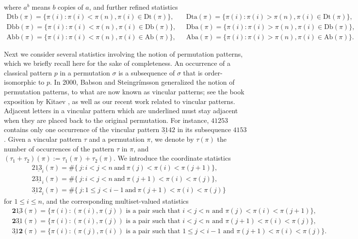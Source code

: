 \documentclass[12pt]{amsart}
\numberwithin{equation}{section}
\theoremstyle{plain}
\theoremstyle{definition}
\def\des{\mathrm{des}}
\def\Db{\mathrm{Db}}
\def\Ab{\mathrm{Ab}}
\def\Dt{\mathrm{Dt}}
\def\Dtb{\mathrm{Dtb}}
\def\Dta{\mathrm{Dta}}
\def\Dbb{\mathrm{Dbb}}
\def\Dba{\mathrm{Dba}}
\def\Abb{\mathrm{Abb}}
\def\Aba{\mathrm{Aba}}
\def\pprs{\mathrm{2\underline{13}}}
\def\ppwrs{\mathrm{2\underline{31}}}
\def\pp31-2{\mathrm{\underline{31}2}}
\def\rightascent{{\mathbf{2}\underline{13}}}
\def\leftdescent{\mathrm{\underline{31}}\mathbf{2}}
\def\rightdescent{\mathrm{\mathbf{2}\underline{31}}}
\def\inv{\mathrm{inv}}
\def\inv{\mathrm{inv}}
\begin{document}
where $a^b$ means $b$ copies of $a$, and further refined statistics
\begin{align*}
  \Dtb(\pi)=\{\pi(i) : \pi(i) <\pi(n), \pi(i) \in \Dt(\pi)\}, &\,\,\,\, \Dta(\pi)=\{\pi(i) : \pi(i) >\pi(n), \pi(i) \in \Dt(\pi)\}, \\[3pt]
  \Dbb(\pi)=\{\pi(i) : \pi(i) <\pi(n), \pi(i) \in \Db(\pi)\}, &\,\,\,\, \Dba(\pi)=\{\pi(i) : \pi(i) >\pi(n), \pi(i) \in \Db(\pi)\}, \\[3pt]
  \Abb(\pi)=\{\pi(i) : \pi(i) <\pi(n), \pi(i) \in \Ab(\pi)\}, & \,\,\,\,\Aba(\pi)=\{\pi(i) : \pi(i) >\pi(n), \pi(i) \in \Ab(\pi)\}.
\end{align*}


Next we consider several statistics involving the notion of permutation patterns, which we briefly recall here for the sake of completeness. An occurrence of a classical pattern $p$ in a permutation $\sigma$ is a subsequence of $\sigma$ that is order-isomorphic to $p$. In 2000, Babson and Steingr\'{i}msson \cite{BS} generalized the notion of permutation patterns, to what are now known as vincular patterns; see the book exposition by Kitaev \cite{Kit}, as well as our recent work \cite{ChenFu} related to vincular patterns. Adjacent letters in a vincular pattern which are underlined must stay adjacent when they are placed back to the original permutation. For instance, $41253$ contains only one occurrence of the vincular pattern $\underline{31}42$ in its subsequence $4153$. Given a vincular pattern $\tau$ and a permutation $\pi$, we denote by $\tau(\pi)$ the number of occurrences of the pattern $\tau$ in $\pi$, and $(\tau_1+\tau_2)(\pi):=\tau_1(\pi)+\tau_2(\pi)$. We introduce the coordinate statistics
\begin{eqnarray*}
& \pprs_i (\pi) =  \# \{ ~j : i <j <n  ~\text{and}~  \pi(j) < \pi(i) < \pi(j+1)  \},  \\[3pt]
&\ppwrs_i (\pi) =  \# \{ ~j : i <j <n  ~\text{and}~  \pi(j+1) < \pi(i) < \pi(j)  \},  \\[3pt]
&\pp31-2_i (\pi) =  \# \{ ~j : 1  \leq j <i-1  ~\text{and}~  \pi(j+1) < \pi(i) < \pi(j)  \}
\end{eqnarray*}
for $1\le i\le n$, and the corresponding multiset-valued statistics
\begin{eqnarray*}
  &\rightascent(\pi) = \{\pi(i) : (\pi(i), \pi(j)) \text{ is a pair such that } i<j<n \text{ and } \pi(j) < \pi(i) < \pi(j+1) \}, \\[4pt]
   & \rightdescent(\pi) = \{\pi(i) : (\pi(i), \pi(j)) \text{ is a pair such that } i<j<n \text{ and } \pi(j+1) < \pi(i) < \pi(j) \}, \\[4pt]
  & \leftdescent(\pi) = \{\pi(i) : (\pi(j), \pi(i)) \text{ is a pair such that } 1 \leq j <i-1 \text{ and } \pi(j+1) < \pi(i) < \pi(j) \}.
\end{eqnarray*}
\end{document}
